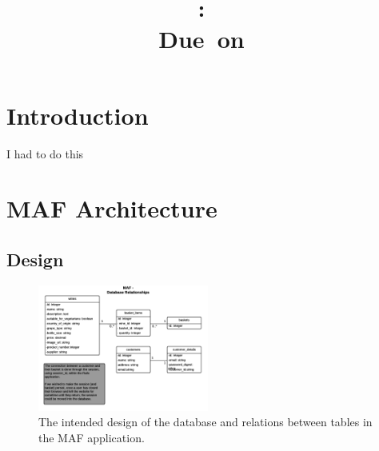 \documentclass[12pt]{article}
\title{
\vspace{2in}
\textmd{\textbf{\hmwkClass:\ \hmwkTitle}}\\
\normalsize\vspace{0.1in}\small{Due\ on\ \hmwkDueDate}\\
\vspace{3in}
}
\author{\textbf{\hmwkAuthorName}}
\date{} %
\begin{document}
\maketitle



\newpage
\tableofcontents
\newpage



\section{Introduction}

 I had to do this \cite{assignment}


\section{MAF Architecture}
\subsection{Design}

\begin{figure}[H]
        \centering
                \includegraphics[width=0.5\textwidth]{assets/MAF_Database_relationships}
                \caption{The intended design of the database and relations between tables in the MAF application.}
                \label{fig: Intended MAF Database relationships.} 
\end{figure}
\end{document}
